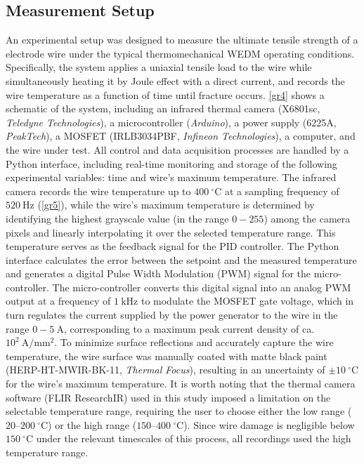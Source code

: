 \documentclass[5p,times,procedia]{elsarticle}
\begin{document}
\subsection{Measurement Setup}
\label{setup}
An experimental setup was designed to measure the ultimate tensile strength of a electrode wire under the typical thermomechanical WEDM operating conditions. Specifically, the system applies a uniaxial tensile load to the wire while simultaneously heating it by Joule effect with a direct current, and records the wire temperature as a function of time until fracture occurs. \autoref{gr4} shows a schematic of the system, including an infrared thermal camera (X6801sc, \emph{Teledyne Technologies}), a microcontroller (\emph{Arduino}), a power supply (6225A, \emph{PeakTech}), a MOSFET (IRLB3034PBF, \emph{Infineon Technologies}), a computer, and the wire under test. All control and data acquisition processes are handled by a Python interface, including real-time monitoring and storage of the following experimental variables: time and wire's maximum temperature. The infrared camera records the wire temperature up to $400~\mathrm{^\circ C}$ at a sampling frequency of $520~\mathrm{Hz}$ (\autoref{gr5}), while the wire's maximum temperature is determined by identifying the highest grayscale value (in the range $0-255$) among the camera pixels and linearly interpolating it over the selected temperature range. This temperature serves as the feedback signal for the PID controller. The Python interface calculates the error between the setpoint and the measured temperature and generates a digital Pulse Width Modulation (PWM) signal for the micro-controller. The micro-controller converts this digital signal into an analog PWM output at a frequency of $1~\mathrm{kHz}$ to modulate the MOSFET gate voltage, which in turn regulates the current supplied by the power generator to the wire in the range $0- 5~\mathrm{A}$, corresponding to a maximum peak current density of ca. $10^{2}~\mathrm{A/mm^2}$. To minimize surface reflections and accurately capture the wire temperature, the wire surface was manually coated with matte black paint (HERP-HT-MWIR-BK-11, \emph{Thermal Focus}), resulting in an uncertainty of $\pm 10~\mathrm{^\circ C}$ for the wire's maximum temperature. It is worth noting that the thermal camera software (FLIR ResearchIR) used in this study imposed a limitation on the selectable temperature range, requiring the user to choose either the low range ($20–200~\mathrm{^\circ C}$) or the high range ($150–400~\mathrm{^\circ C}$). Since wire damage is negligible below $150~\mathrm{^\circ C}$ under the relevant timescales of this process, all recordings used the high temperature range.
\end{document}
